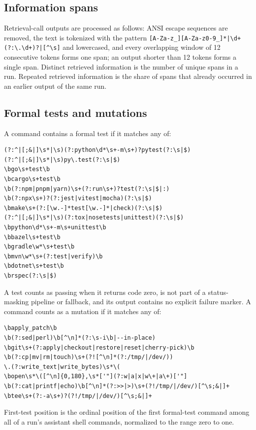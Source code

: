 \documentclass{article}
\begin{document}
\subsection{Information spans}
\label{app:spans}

Retrieval-call outputs are processed as follows: ANSI escape sequences are removed, the text is tokenized with the pattern \verb![A-Za-z_][A-Za-z0-9_]*|\d+(?:\.\d+)?|[^\s]! and lowercased, and every overlapping window of 12 consecutive tokens forms one span; an output shorter than 12 tokens forms a single span. Distinct retrieved information is the number of unique spans in a run. Repeated retrieved information is the share of spans that already occurred in an earlier output of the same run.

\subsection{Formal tests and mutations}
\label{app:tests}

A command contains a formal test if it matches any of:

\begin{verbatim}
(?:^|[;&|]\s*|\s)(?:python\d*\s+-m\s+)?pytest(?:\s|$)
(?:^|[;&|]\s*|\s)py\.test(?:\s|$)
\bgo\s+test\b
\bcargo\s+test\b
\b(?:npm|pnpm|yarn)\s+(?:run\s+)?test(?:\s|$|:)
\b(?:npx\s+)?(?:jest|vitest|mocha)(?:\s|$)
\bmake\s+(?:[\w.-]*test[\w.-]*|check)(?:\s|$)
(?:^|[;&|]\s*|\s)(?:tox|nosetests|unittest)(?:\s|$)
\bpython\d*\s+-m\s+unittest\b
\bbazel\s+test\b
\bgradle\w*\s+test\b
\bmvn\w*\s+(?:test|verify)\b
\bdotnet\s+test\b
\brspec(?:\s|$)
\end{verbatim}

A test counts as passing when it returns code zero, is not part of a status-masking pipeline or fallback, and its output contains no explicit failure marker. A command counts as a mutation if it matches any of:

\begin{verbatim}
\bapply_patch\b
\b(?:sed|perl)\b[^\n]*(?:\s-i\b|--in-place)
\bgit\s+(?:apply|checkout|restore|reset|cherry-pick)\b
\b(?:cp|mv|rm|touch)\s+(?![^\n]*(?:/tmp/|/dev/))
\.(?:write_text|write_bytes)\s*\(
\bopen\s*\([^\n]{0,180},\s*['"](?:w|a|x|w\+|a\+)['"]
\b(?:cat|printf|echo)\b[^\n]*(?:>>|>)\s+(?!/tmp/|/dev/)[^\s;&|]+
\btee\s+(?:-a\s+)?(?!/tmp/|/dev/)[^\s;&|]+
\end{verbatim}

First-test position is the ordinal position of the first formal-test command among all of a run's assistant shell commands, normalized to the range zero to one.
\end{document}
